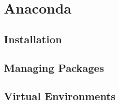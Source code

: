 \chapter{Anaconda}

\section{Installation}

\section{Managing Packages}

\section{Virtual Environments}
